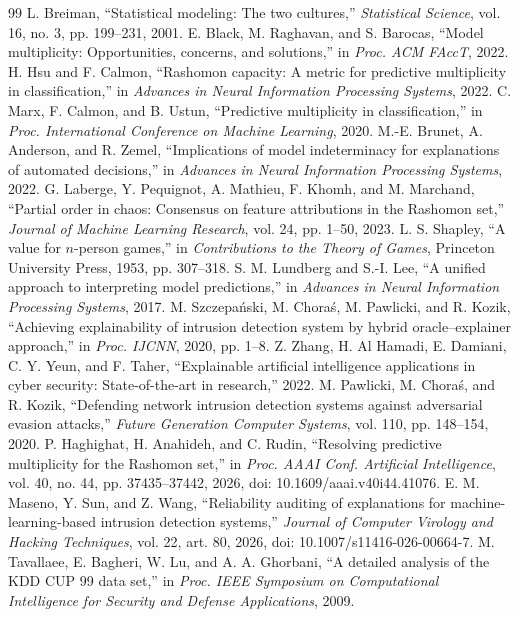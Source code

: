 \documentclass[10pt,conference]{IEEEtran}
\begin{document}
\balance
\begin{thebibliography}{99}
 L. Breiman, ``Statistical modeling: The two cultures,'' \emph{Statistical Science}, vol. 16, no. 3, pp. 199--231, 2001.
 E. Black, M. Raghavan, and S. Barocas, ``Model multiplicity: Opportunities, concerns, and solutions,'' in \emph{Proc. ACM FAccT}, 2022.
 H. Hsu and F. Calmon, ``Rashomon capacity: A metric for predictive multiplicity in classification,'' in \emph{Advances in Neural Information Processing Systems}, 2022.
 C. Marx, F. Calmon, and B. Ustun, ``Predictive multiplicity in classification,'' in \emph{Proc. International Conference on Machine Learning}, 2020.
 M.-E. Brunet, A. Anderson, and R. Zemel, ``Implications of model indeterminacy for explanations of automated decisions,'' in \emph{Advances in Neural Information Processing Systems}, 2022.
 G. Laberge, Y. Pequignot, A. Mathieu, F. Khomh, and M. Marchand, ``Partial order in chaos: Consensus on feature attributions in the Rashomon set,'' \emph{Journal of Machine Learning Research}, vol. 24, pp. 1--50, 2023.
 L. S. Shapley, ``A value for $n$-person games,'' in \emph{Contributions to the Theory of Games}, Princeton University Press, 1953, pp. 307--318.
 S. M. Lundberg and S.-I. Lee, ``A unified approach to interpreting model predictions,'' in \emph{Advances in Neural Information Processing Systems}, 2017.
 M. Szczepa\'nski, M. Chora\'s, M. Pawlicki, and R. Kozik, ``Achieving explainability of intrusion detection system by hybrid oracle--explainer approach,'' in \emph{Proc. IJCNN}, 2020, pp. 1--8.
 Z. Zhang, H. Al Hamadi, E. Damiani, C. Y. Yeun, and F. Taher, ``Explainable artificial intelligence applications in cyber security: State-of-the-art in research,'' 2022.
 M. Pawlicki, M. Chora\'s, and R. Kozik, ``Defending network intrusion detection systems against adversarial evasion attacks,'' \emph{Future Generation Computer Systems}, vol. 110, pp. 148--154, 2020.
 P. Haghighat, H. Anahideh, and C. Rudin, ``Resolving predictive multiplicity for the Rashomon set,'' in \emph{Proc. AAAI Conf. Artificial Intelligence}, vol. 40, no. 44, pp. 37435--37442, 2026, doi: 10.1609/aaai.v40i44.41076.
 E. M. Maseno, Y. Sun, and Z. Wang, ``Reliability auditing of explanations for machine-learning-based intrusion detection systems,'' \emph{Journal of Computer Virology and Hacking Techniques}, vol. 22, art. 80, 2026, doi: 10.1007/s11416-026-00664-7.
 M. Tavallaee, E. Bagheri, W. Lu, and A. A. Ghorbani, ``A detailed analysis of the KDD CUP 99 data set,'' in \emph{Proc. IEEE Symposium on Computational Intelligence for Security and Defense Applications}, 2009.
\end{thebibliography}
\end{document}
